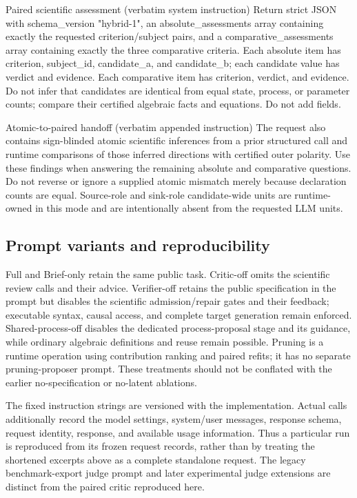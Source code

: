\begin{afpromptbox}{Paired scientific assessment (verbatim system instruction)}
Return strict JSON with schema_version "hybrid-1", an absolute_assessments
array containing exactly the requested criterion/subject pairs, and a
comparative_assessments array containing exactly the three comparative
criteria. Each absolute item has criterion, subject_id, candidate_a, and
candidate_b; each candidate value has verdict and evidence. Each comparative
item has criterion, verdict, and evidence. Do not infer that candidates are
identical from equal state, process, or parameter counts; compare their
certified algebraic facts and equations. Do not add fields.
\end{afpromptbox}

\begin{afpromptbox}{Atomic-to-paired handoff (verbatim appended instruction)}
The request also contains sign-blinded atomic scientific inferences from a
prior structured call and runtime comparisons of those inferred directions
with certified outer polarity. Use these findings when answering the
remaining absolute and comparative questions. Do not reverse or ignore a
supplied atomic mismatch merely because declaration counts are equal.
Source-role and sink-role candidate-wide units are runtime-owned in this
mode and are intentionally absent from the requested LLM units.
\end{afpromptbox}

\subsection{Prompt variants and reproducibility}

Full and Brief-only retain the same public task. Critic-off omits the scientific
review calls and their advice. Verifier-off retains the public specification in
the prompt but disables the scientific admission/repair gates and their feedback;
executable syntax, causal access, and complete target generation remain enforced.
Shared-process-off disables the dedicated process-proposal stage and its guidance,
while ordinary algebraic definitions and reuse remain possible. Pruning is a
runtime operation using contribution ranking and paired refits; it has no
separate pruning-proposer prompt. These treatments should not be conflated with
the earlier no-specification or no-latent ablations.

The fixed instruction strings are versioned with the implementation. Actual
calls additionally record the model settings, system/user messages, response
schema, request identity, response, and available usage information. Thus a
particular run is reproduced from its frozen request records, rather than by
treating the shortened excerpts above as a complete standalone request. The
legacy benchmark-export judge prompt and later experimental judge extensions
are distinct from the paired critic reproduced here.

